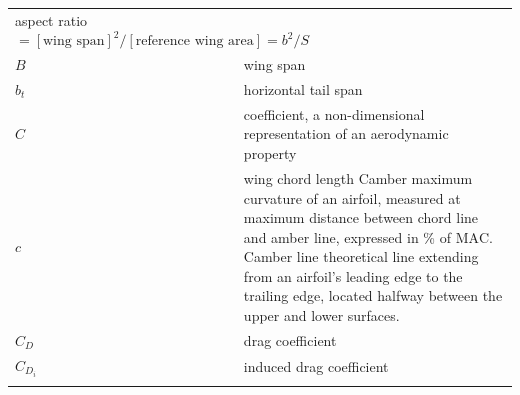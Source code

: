 \documentclass[
]{book}
\begin{document}
\begin{longtable}[]{@{}ll@{}}
\begin{minipage}[t]{0.72\columnwidth}
aspect ratio \(= [\text{wing span}]^2 / [\text{reference wing area}] = b^2/S\)\strut
\end{minipage}\tabularnewline
\begin{minipage}[t]{0.22\columnwidth}\raggedright
\(B\)\strut
\end{minipage} & \begin{minipage}[t]{0.72\columnwidth}\raggedright
wing span\strut
\end{minipage}\tabularnewline
\begin{minipage}[t]{0.22\columnwidth}\raggedright
\(b_t\)\strut
\end{minipage} & \begin{minipage}[t]{0.72\columnwidth}\raggedright
horizontal tail span\strut
\end{minipage}\tabularnewline
\begin{minipage}[t]{0.22\columnwidth}\raggedright
\(C\)\strut
\end{minipage} & \begin{minipage}[t]{0.72\columnwidth}\raggedright
coefficient, a non-dimensional representation of an aerodynamic property\strut
\end{minipage}\tabularnewline
\begin{minipage}[t]{0.22\columnwidth}\raggedright
\(c\)\strut
\end{minipage} & \begin{minipage}[t]{0.72\columnwidth}\raggedright
wing chord length Camber maximum curvature of an airfoil, measured at maximum distance between chord line and amber line, expressed in \% of \(\mathrm{MAC}\). Camber line theoretical line extending from an airfoil's leading edge to the trailing edge, located halfway between the upper and lower surfaces.\strut
\end{minipage}\tabularnewline
\begin{minipage}[t]{0.22\columnwidth}\raggedright
\(C_D\)\strut
\end{minipage} & \begin{minipage}[t]{0.72\columnwidth}\raggedright
drag coefficient\strut
\end{minipage}\tabularnewline
\begin{minipage}[t]{0.22\columnwidth}\raggedright
\(C_{D_i}\)\strut
\end{minipage} & \begin{minipage}[t]{0.72\columnwidth}\raggedright
induced drag coefficient\strut
\end{minipage}\tabularnewline
\begin{minipage}[t]{0.22\columnwidth}\raggedright

\end{minipage}
\end{longtable}
\end{document}
